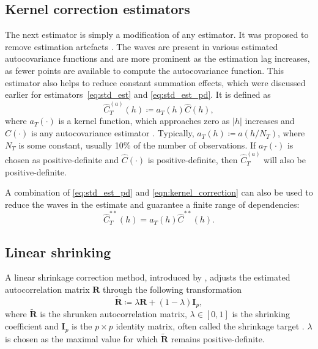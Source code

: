 \subsection{Kernel correction estimators}
The next estimator is simply a modification of any estimator. It was proposed to remove estimation  artefacts \citep[Section~3.17]{Yaglom1987}. The waves are present in various estimated autocovariance functions and are more prominent as the estimation lag increases, as fewer points are available to compute the autocovariance function. This estimator also helps to reduce constant summation effects, which were discussed earlier for estimators~\eqref{eq:std_est} and \eqref{eq:std_est_pd}. It is defined as
\begin{equation} \label{eqn:kernel_correction}
    \widehat{C}_{T}^{(a)}(h) \coloneq a_{T}(h) \widehat{C}(h) ,
\end{equation}
where \(a_{T}(\cdot)\) is a kernel function, which approaches zero as \(\left| h \right|\) increases and \(\widehat{C}(\cdot)\) is any autocovariance estimator \citep[Section~3.17]{Yaglom1987}.
Typically, \(a_{T}(h) \coloneq a(h / N_{T})\), where \(N_{T}\) is some constant, usually 10\% of the number of observations. %
If \(a_{T}(\cdot)\) is chosen as positive-definite and \(\widehat{C}(\cdot)\) is positive-definite, then \(\widehat{C}_{T}^{(a)}\) will also be positive-definite.

A combination of \eqref{eq:std_est_pd} and \eqref{eqn:kernel_correction} can also be used to reduce the waves in the estimate and guarantee a finite range of dependencies:
\begin{equation} \label{eqn:kernel_correction_std_pd}
    \widehat{C}_{T}^{**}(h) = a_{T}(h) \widehat{C}^{**}(h) .
\end{equation}

\subsection{Linear shrinking}
A linear shrinkage correction method, introduced by \citet{Devlin1975}, adjusts the estimated autocorrelation matrix \(\bm{R}\) through the following transformation
\begin{equation} \label{eqn:linear_shrinking}
    \widetilde{\bm{R}} \coloneq \lambda \bm{R} + (1 - \lambda)\bm{I}_{p} ,
\end{equation}
where \(\widetilde{\bm{R}}\) is the shrunken autocorrelation matrix, \(\lambda \in [0, 1]\) is the shrinking coefficient and \(\bm{I}_{p}\) is the \(p \times p\) identity matrix, often called the shrinkage target \citep{Rousseeuw1993}.
\(\lambda\) is chosen as the maximal value for which \(\widetilde{\bm{R}}\)
remains positive-definite.

